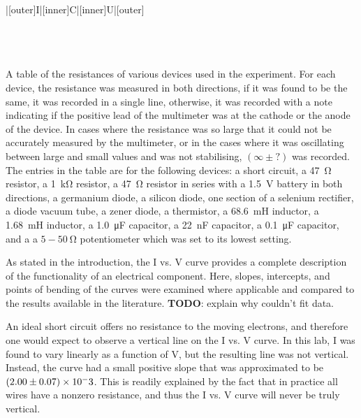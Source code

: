 \begin{paper}
{\begin{papertable}{|[outer]I|[inner]C|[inner]U|[outer]}
\papertableindex{}\\\paperiline
\papertableindex{}\\\paperiline
\papertableindex{}\\\paperiline
\papertableindex{}\\\paperoline
\end{papertable}\vspace{-1.5em}}
{A table of the resistances of various devices used in the experiment.
For each device, the resistance was measured in both directions, if it was found to be the same, it was recorded in a single line,
otherwise, it was recorded with a note indicating if the positive lead of the multimeter was at the cathode or the anode of the device.
In cases where the resistance was so large that it could not be accurately measured by the multimeter, or in the cases where it was oscillating between large and small values and was not stabilising, $(\infty\pm?)$ was recorded.
The entries in the table are for the following devices: a short circuit, a \SI{47}{\ohm} resistor, a \SI{1}{\kilo\ohm} resistor, a \SI{47}{\ohm} resistor in series with a \SI{1.5}{\volt} battery in both directions, a germanium diode, a silicon diode, one section of a selenium rectifier, a diode vacuum tube, a zener diode, a thermistor, a \SI{68.6}{\milli\henry} inductor, a \SI{1.68}{\milli\henry} inductor, a \SI{1.0}{\micro\farad} capacitor, a \SI{22}{\nano\farad} capacitor, a \SI{0.1}{\micro\farad} capacitor, and a a $5-\SI{50}{\ohm}$ potentiometer which was set to its lowest setting.}
	
	
	As stated in the introduction, the I vs. V curve provides a complete description of the functionality of an electrical component. Here, slopes, intercepts, and points of bending of the curves were examined where applicable and compared to the results available in the literature. \textbf{TODO}: explain why couldn't fit data.
	
	An ideal short circuit offers no resistance to the moving electrons, and therefore one would expect to observe a vertical line on the I vs. V curve. In this lab, I was found to vary linearly as a function of V, but the resulting line was not vertical. Instead, the curve had a small positive slope that was approximated to be \( \left(2.00 \pm 0.07\right) \times 10^-3 \). This is readily explained by the fact that in practice all wires have a nonzero resistance, and thus the I vs. V curve will never be truly vertical.
	

\end{paper}
